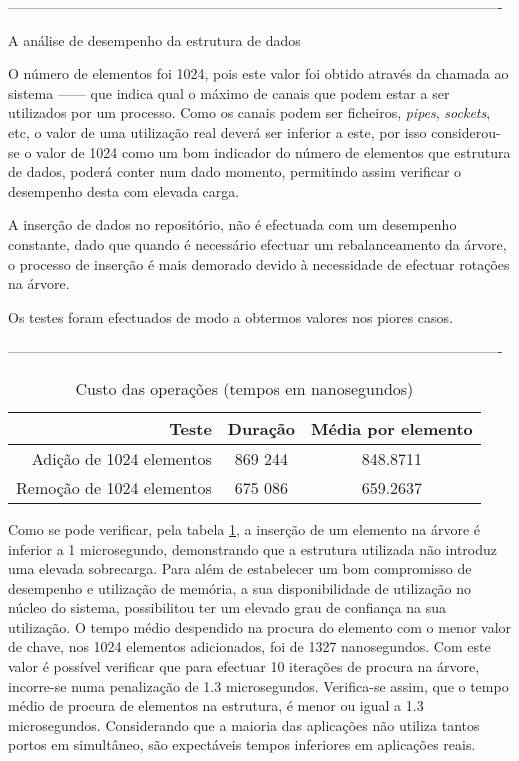 ----------------------------------------------------------------------------------------------------------

A análise de desempenho da estrutura de dados

O número de elementos foi 1024, pois este valor foi obtido através da chamada ao sistema ------ que indica qual o máximo de canais que podem estar a ser utilizados por um processo.
Como os canais podem ser ficheiros, \textit{pipes}, \textit{sockets}, etc, o valor de uma utilização real deverá ser inferior a este, por isso considerou-se o valor de 1024 como um bom indicador do número de elementos que estrutura de dados, poderá conter num dado momento, permitindo assim verificar o desempenho desta com elevada carga.

A inserção de dados no repositório, não é efectuada com um desempenho constante, dado que quando é necessário efectuar um rebalanceamento da árvore, o processo de inserção é mais demorado devido à necessidade de efectuar rotações na árvore.

Os testes foram efectuados de modo a obtermos valores nos piores casos.

----------------------------------------------------------------------------------------------------------
 
\begin{table}[!htb]
\begin{center}
\caption{Custo das operações (tempos em nanosegundos)}
\begin{tabular}{ | r | c | c | }
\hline
\hspace{1cm} Teste \hspace{1.5cm} & \hspace{1cm}Duração\hspace{1cm} &  Média por
elemento \\
\hline
Adição de 1024 elementos & 869 244 & 848.8711 \\
\hline
Remoção de 1024 elementos & 675 086 & 659.2637\\
\hline

\hline
\end{tabular}
\label{tab:tree_info}
\end{center}
\end{table}

Como se pode verificar, pela tabela \ref{tab:tree_info}, a inserção de um elemento na árvore é inferior a 1 microsegundo, demonstrando que a estrutura utilizada não introduz uma elevada sobrecarga.
Para além de estabelecer um bom compromisso de desempenho e utilização de memória, a sua disponibilidade de utilização no núcleo do sistema, possibilitou ter um elevado grau de confiança na sua utilização.
O tempo médio despendido na procura do elemento com o menor valor de chave, nos 1024 elementos adicionados, foi de 1327 nanosegundos.
Com este valor é possível verificar que para efectuar 10 iterações de procura na árvore, incorre-se numa penalização de 1.3 microsegundos.
Verifica-se assim, que o tempo médio de procura de elementos na estrutura, é menor ou igual a 1.3 microsegundos.
Considerando que a maioria das aplicações não utiliza tantos portos em simultâneo, são expectáveis tempos inferiores em aplicações reais.


